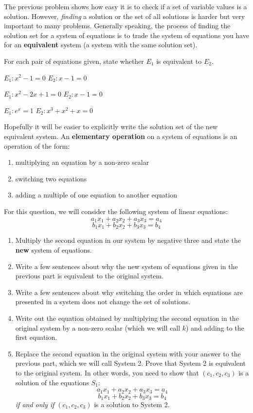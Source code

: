 The previous problem shows how easy it is to check if a set of variable values is a solution. However, \emph{finding} a solution or the set of all solutions is harder but very important to many problems. Generally speaking, the process of finding the solution set for a system of equations is to trade the system of equations you have for an \textbf{equivalent} system (a system with the same solution set).

\bq For each pair of equations given, state whether $E_1$ is equivalent to $E_2$.
\be
\item $E_1: x^2-1=0$ \hfill $E_2: x-1=0$
\item $E_1: x^2-2x+1=0$ \hfill $E_2: x-1=0$
\item $E_1: e^x=1$ \hfill $E_2: x^3+x^2+x=0$
\ee \eq


Hopefully it will be easier to explicitly write the solution set of the new equivalent system. An \textbf{elementary operation} on a system of equations is an operation of the form:
\begin{enumerate}
\item multiplying an equation by a non-zero scalar
\item switching two equations
\item adding a multiple of one equation to another equation
\end{enumerate}

\begin{question}
For this question, we will consider the following system of linear equations:
$$a_1 x_1+a_2x_2+a_3x_3=a_4$$
$$b_1 x_1+b_2x_2+b_3x_3=b_4$$
\begin{enumerate}
\item Multiply the second equation in our system by negative three and state the \textbf{new} system of equations.
\item Write a few sentences about why the new system of equations given in the previous part is equivalent to the original system.
\item Write a few sentences about why switching the order in which equations are presented in a system does not change the set of solutions.
\item Write out the equation obtained by multiplying the second equation in the original system by a non-zero scalar (which we will call $k$) and adding to the first equation.
\item Replace the second equation in the original system with your answer to the previous part, which we will call System 2. Prove that System 2 is equivalent to the original system. In other words, you need to show that $(c_1,c_2,c_3)$ is a solution of the equations $S_1$:
    $$a_1 x_1+a_2x_2+a_3x_3=a_4$$
    $$b_1 x_1+b_2x_2+b_3x_3=b_4$$
    \emph{if and only if} $(c_1,c_2,c_3)$ is a solution to System 2.
\end{enumerate}

\end{question}


